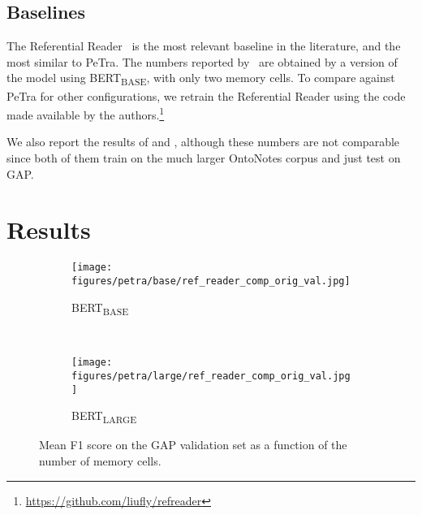 \documentclass[12pt]{thesis-umich}[thesis]
\newcommand{\bertbase}{BERT\textsubscript{BASE}\xspace}
\newcommand{\bertlarge}{BERT\textsubscript{LARGE}\xspace}
\begin{document}
\subsection{Baselines}
The Referential Reader~\cite{liu2019referential} is the most relevant baseline in the literature, and the most similar to PeTra.
The numbers reported by~\citet{liu2019referential} are obtained by a version of the model using \bertbase, with only two memory cells.
To compare against PeTra for other configurations, we retrain the Referential Reader using the code made available by the authors.\footnote{\url{https://github.com/liufly/refreader}}

We also report the results of \citet{joshi-etal-2019-bert} and \citet{wu2019coreference}, although these numbers are not comparable since both of them train on the much larger OntoNotes corpus and just test on GAP.




\section{Results}


\begin{figure}[t]
\centering
\begin{subfigure}[b]{0.47\textwidth}
        \centering
        \texttt{[image: figures/petra/base/ref\_reader\_comp\_orig\_val.jpg]}
        \caption{\bertbase}
        \label{fig:gap_val_small}
    \end{subfigure}~
    \begin{subfigure}[b]{0.47\textwidth}
        \centering
        \texttt{[image: figures/petra/large/ref\_reader\_comp\_orig\_val.jpg]}
        \caption{\bertlarge}
        \label{fig:gap_val_large}
    \end{subfigure}
    \caption{Mean F1 score on the GAP validation set as a function of the number of memory cells.}
    \label{fig:gap_val}
\end{figure}
\end{document}
